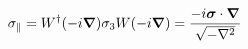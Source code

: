 \begin{equation}
\sigma_{\parallel} = W^{\dag} (-i \mbox{\boldmath $\nabla$}) \sigma_{3} W (-i \mbox{\boldmath $\nabla$}) =
\frac{-i \mbox{\boldmath $\sigma$} \cdot \mbox{\boldmath $\nabla$}}{\sqrt{- \nabla^{2}}}   \nonumber
\end{equation}

